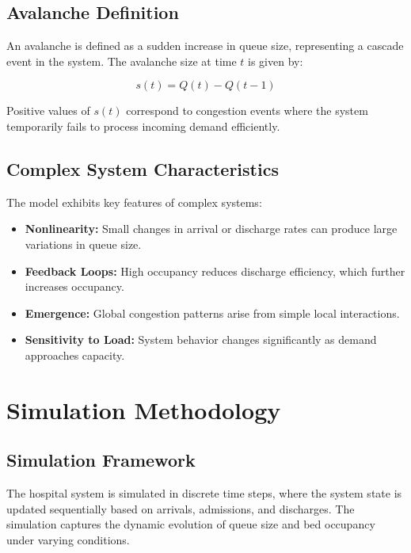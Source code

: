 \documentclass[11pt]{article}
\begin{document}
\vspace{0.3cm}

\subsection{Avalanche Definition}

An avalanche is defined as a sudden increase in queue size, representing a cascade event in the system. The avalanche size at time $t$ is given by:

\begin{equation}
s(t) = Q(t) - Q(t-1)
\end{equation}

Positive values of $s(t)$ correspond to congestion events where the system temporarily fails to process incoming demand efficiently.

\vspace{0.3cm}

\subsection{Complex System Characteristics}

The model exhibits key features of complex systems:

\begin{itemize}
\item \textbf{Nonlinearity:} Small changes in arrival or discharge rates can produce large variations in queue size.
\item \textbf{Feedback Loops:} High occupancy reduces discharge efficiency, which further increases occupancy.
\item \textbf{Emergence:} Global congestion patterns arise from simple local interactions.
\item \textbf{Sensitivity to Load:} System behavior changes significantly as demand approaches capacity.
\end{itemize}
\section{Simulation Methodology}

\subsection{Simulation Framework}

The hospital system is simulated in discrete time steps, where the system state is updated sequentially based on arrivals, admissions, and discharges. The simulation captures the dynamic evolution of queue size and bed occupancy under varying conditions.
\end{document}
